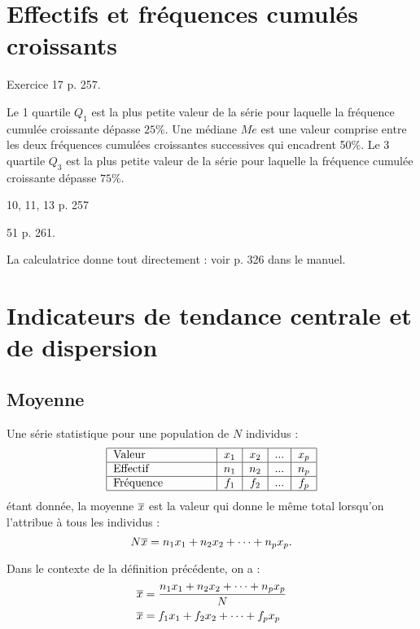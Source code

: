 \documentclass[a4paper,11pt,DIV12,BCOR0mm]{scrartcl}
\begin{document}
\section{Effectifs et fréquences cumulés croissants}

\begin{exemple}
 Exercice 17 p. 257.
\end{exemple}

\begin{definition}
 Le 1 quartile $Q_1$ est la plus petite valeur de la série pour laquelle 
la fréquence cumulée croissante dépasse $25\%$. Une médiane $Me$ est une valeur
comprise entre les deux fréquences cumulées croissantes successives
qui encadrent 50\%. Le 3 quartile $Q_3$ est la plus petite valeur de la série pour laquelle
la fréquence cumulée croissante dépasse $75\%$.
\end{definition}


\begin{exercice}
 10, 11, 13 p. 257
\end{exercice}


\begin{exercice}
 51 p. 261.
\end{exercice}

\begin{remarque}
 La calculatrice donne tout directement : voir p. 326 dans le manuel.
\end{remarque}


\section{Indicateurs de tendance centrale et de dispersion}
\subsection{Moyenne}
\begin{definition}
Une série statistique pour une population de $N$ individus :
\[ 
\begin{tabular}{|p{3cm}|c|c|c|c|}
 \hline
 \text{Valeur}		&	$x_1$	&	$x_2$	&	...	&	$x_p$ \\\hline
 Effectif	&	$n_1$	&	$n_2$	&	...	&	$n_p$ \\\hline
 Fréquence	&	$f_1$	&	$f_2$	&	...	&	$f_p$ \\\hline
\end{tabular}
\]
étant donnée, la moyenne $\overline{x}$ est la valeur qui donne le même total lorsqu'on
l'attribue à tous les individus :
\[
 N\overline{x}=n_1x_1+n_2x_2+\cdots+n_px_p.
\]
\end{definition}
\begin{theoreme}
 Dans le contexte de la définition précédente, on a :
\begin{align*}
 \overline{x}&=\dfrac{n_1x_1+n_2x_2+\cdots+n_px_p}{N}\\
 \overline{x}&=f_1x_1+f_2x_2+\cdots+f_px_p
\end{align*}
\end{theoreme}
\end{document}
